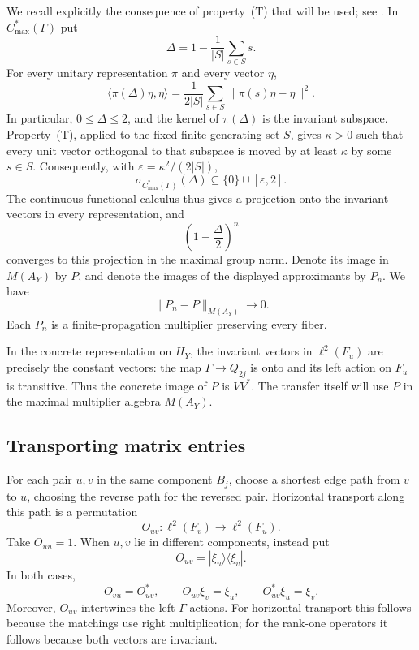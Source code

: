 We recall explicitly the consequence of property~\textup{(T)} that will
be used; see \cite{BHV08}.  In $C^*_{\max}(\Gamma)$ put
\[
 \Delta=1-\frac1{|S|}\sum_{s\in S}s.
\]
For every unitary representation $\pi$ and every vector $\eta$,
\[
 \langle\pi(\Delta)\eta,\eta\rangle
   =\frac1{2|S|}\sum_{s\in S}
      \|\pi(s)\eta-\eta\|^2.
\]
In particular, $0\le\Delta\le2$, and the kernel of $\pi(\Delta)$ is
the invariant subspace.  Property~\textup{(T)}, applied to the fixed finite
generating set $S$, gives $\kappa>0$ such that every unit vector
orthogonal to that subspace is moved by at least $\kappa$ by some
$s\in S$.  Consequently, with $\varepsilon=\kappa^2/(2|S|)$,
\[
 \sigma_{C^*_{\max}(\Gamma)}(\Delta)
     \subseteq\{0\}\cup[\varepsilon,2].
\]
The continuous functional calculus thus gives a projection onto the
invariant vectors in every representation, and
\[
 \left(1-\frac{\Delta}{2}\right)^n
\]
converges to this projection in the maximal group norm.  Denote its image
in $M(A_Y)$ by $P$, and denote the images of the displayed approximants
by $P_n$.  We have
\begin{equation}\label{eq:kazhdan-convergence}
 \|P_n-P\|_{M(A_Y)}\longrightarrow0.
\end{equation}
Each $P_n$ is a finite-propagation multiplier preserving every fiber.

In the concrete representation on $H_Y$, the invariant vectors in
$\ell^2(F_u)$ are precisely the constant vectors: the map
$\Gamma\to Q_{2j}$ is onto and its left action on $F_u$ is transitive.
Thus the concrete image of $P$ is $VV^*$. The transfer itself will use
$P$ in the maximal multiplier algebra $M(A_Y)$.

\subsection{Transporting matrix entries}

For each pair $u,v$ in the same component $B_j$, choose a shortest edge
path from $v$ to $u$, choosing the reverse path for the reversed pair.
Horizontal transport along this path is a permutation
\[
 O_{uv}:\ell^2(F_v)\longrightarrow\ell^2(F_u).
\]
Take $O_{uu}=1$.  When $u,v$ lie in different components, instead put
\[
 O_{uv}=|\xi_u\rangle\langle\xi_v|.
\]
In both cases,
\begin{equation}\label{eq:transport-constants}
 O_{vu}=O_{uv}^*,\qquad
 O_{uv}\xi_v=\xi_u,\qquad O_{uv}^*\xi_u=\xi_v.
\end{equation}
Moreover, $O_{uv}$ intertwines the left $\Gamma$-actions.  For
horizontal transport this follows because the matchings use right
multiplication; for the rank-one operators it follows because both
vectors are invariant.

